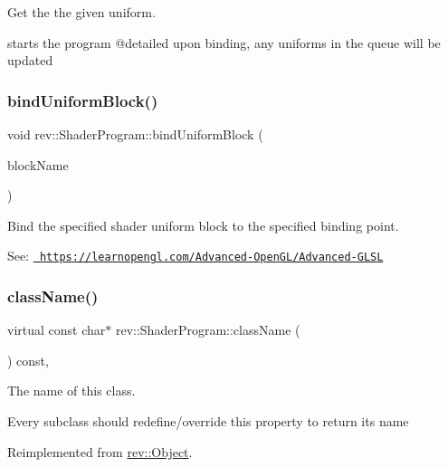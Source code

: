 Get the the given uniform. 

starts the program @detailed upon binding, any uniforms in the queue will be updated \mbox{\label{classrev_1_1_shader_program_a4c0b3cf05a3c12e8314fe4c6c11fd0b9}} 
\subsubsection{\texorpdfstring{bindUniformBlock()}{bindUniformBlock()}}
{\footnotesize\ttfamily void rev\+::\+Shader\+Program\+::bind\+Uniform\+Block (\begin{DoxyParamCaption}\item[{const Q\+String \&}]{block\+Name }\end{DoxyParamCaption})\hspace{0.3cm}{\ttfamily [protected]}}



Bind the specified shader uniform block to the specified binding point. 

See\+: \href{https://learnopengl.com/Advanced-OpenGL/Advanced-GLSL}{\texttt{ https\+://learnopengl.\+com/\+Advanced-\/\+Open\+G\+L/\+Advanced-\/\+G\+L\+SL}} \mbox{\label{classrev_1_1_shader_program_a7400b2b50638b1d150bc339ecd360c4c}} 
\subsubsection{\texorpdfstring{className()}{className()}}
{\footnotesize\ttfamily virtual const char$\ast$ rev\+::\+Shader\+Program\+::class\+Name (\begin{DoxyParamCaption}{ }\end{DoxyParamCaption}) const\hspace{0.3cm}{\ttfamily [inline]}, {\ttfamily [virtual]}}



The name of this class. 

Every subclass should redefine/override this property to return its name 

Reimplemented from \mbox{\hyperlink{classrev_1_1_object_a7a2013f91169479b65cf93afdc5d9a68}{rev\+::\+Object}}.

